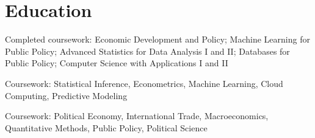 \section{Education}

{\small Completed coursework: Economic Development and Policy; Machine Learning for Public Policy; Advanced Statistics for Data Analysis I and II; Databases for Public Policy; Computer Science with Applications I and II}

\vspace{3.5pt}

{\small Coursework: Statistical Inference, Econometrics, Machine Learning, Cloud Computing, Predictive Modeling}

\vspace{3.5pt}

{\small Coursework: Political Economy, International Trade, Macroeconomics, Quantitative Methods, Public Policy, Political Science}

